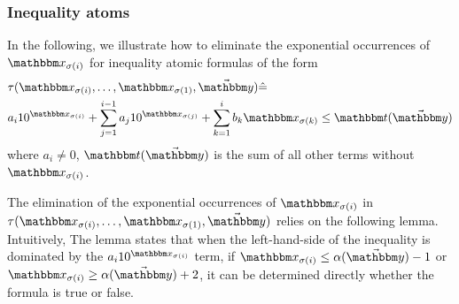 \subsubsection{Inequality atoms}
In the following, we illustrate how to eliminate the exponential occurrences of $\ivarx_{\sigma(i)}$ for inequality atomic formulas of the form 
\begin{equation}\label{tau}
    \begin{aligned}
        &\tau(\ivarx_{\sigma(i)}, \ldots, \ivarx_{\sigma(1)}, \vec{\ivary}) \Def  \\
        &a_i 10^{\ivarx_{\sigma(i)}}+\sum_{j=1}^{i-1} a_j 10^{\ivarx_{\sigma(j)}} + \sum_{k=1}^{i}b_k \ivarx_{\sigma(k)} \le \iterm(\vec{\ivary})
    \end{aligned}            
\end{equation}
where $a_i\neq 0$, $\iterm(\vec \ivary)$ is the sum of all other terms without $\ivarx_{\sigma(i)}$.

The elimination of the exponential occurrences of $\ivarx_{\sigma(i)}$ in $\tau(\ivarx_{\sigma(i)}, \ldots, \ivarx_{\sigma(1)}, \vec{\ivary})$ relies on the following lemma. 
Intuitively, 
The lemma states that when the left-hand-side of the inequality is dominated by the $a_i 10^{\ivarx_{\sigma(i)}}$ term, if $\ivarx_{\sigma(i)}\le \alpha(\vec{\ivary})-1$ or $\ivarx_{\sigma(i)} \ge \alpha(\vec{\ivary})+2$, it can be determined directly whether the formula is true or false.

